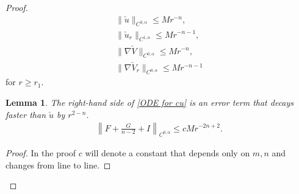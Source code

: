 \documentclass[12pt,twoside]{article}
\theoremstyle{plain}
\newtheorem{lem}[theorem]{Lemma}
\theoremstyle{definition}
\theoremstyle{remark}
\newcommand{\na}{\nabla}
\newcommand{\lt}{\left}
\newcommand{\rt}{\right}
\newcommand{\cu}{\check{u}}
\newcommand{\cV}{\check{V}}
\numberwithin{equation}{section}
\begin{document}
\begin{proof}
\begin{align}
\| \cu\|_{C^{3,\alpha}} \le M r^{-n}\label{initial bound cu},\\
\| \cu_r \|_{C^{1,\alpha}} \le M r^{-n-1}, \label{initial bound cur} \\
\| \na\cV \|_{C^{0,\alpha}} \le M r^{-n}, \label{initial bound cV}\\
\| \na\cV_r \|_{C^{0,\alpha}} \le M r^{-n-1}\label{initial bound cVr}
\end{align}
for $r \ge r_1$. 

\begin{lem}\label{error estimate} The right-hand side of \eqref{ODE for cu} is an error term that decays faster than $\cu$ by $r^{2-n}$.
\begin{align*}
\lt\| F + \frac{G}{n-2} + I \rt\|_{C^{0,\alpha}} \le c M r^{-2n +2}.
\end{align*}
\end{lem}
\begin{proof}
In the proof $c$ will denote a constant that depends only on $m, n$ and changes from line to line.


\end{proof}
\end{proof}
\end{document}
